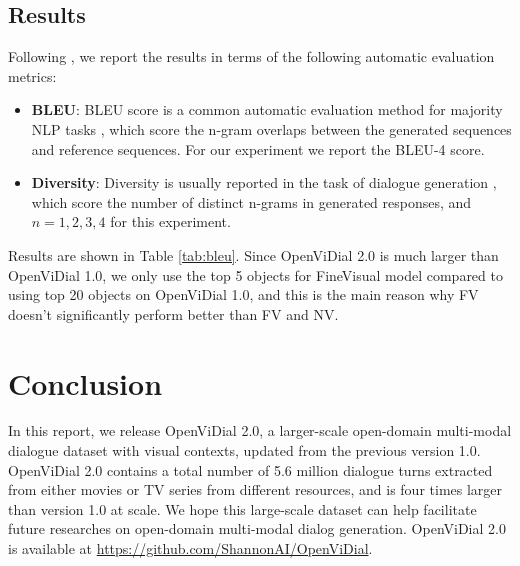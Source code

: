 \documentclass[11pt,a4paper]{article}
\begin{document}
\subsection{Results}
Following \citet{wang2021modeling}, we report the results in terms of the following automatic evaluation metrics: 
\begin{itemize}
    \item {\bf BLEU}: BLEU score is a common automatic evaluation method for majority NLP tasks \citep{papineni2002bleu, sordoni2015neural}, which score the n-gram overlaps between the generated sequences and reference sequences. For our experiment we report the BLEU-4 score.
    \item {\bf Diversity}: Diversity is usually reported in the task of dialogue generation \cite{li2015diversity}, which score the number of distinct n-grams in generated responses, and $n=1,2,3,4$ for this experiment. 
\end{itemize}
Results are shown in Table \ref{tab:bleu}. Since OpenViDial 2.0 is much larger than OpenViDial 1.0, we only use the top 5 objects for FineVisual model compared to using top 20 objects on OpenViDial 1.0, and this is the main reason why FV doesn't significantly perform better than FV and NV. 

\section{Conclusion}
In this report, we release OpenViDial 2.0, a larger-scale open-domain multi-modal dialogue dataset with visual contexts, updated from the previous version 1.0. 
OpenViDial 2.0 contains a total number of 5.6 million dialogue turns extracted from either movies or TV series from different resources,
and is four times larger than version 1.0 at scale. 
We hope this large-scale dataset can help facilitate future researches on open-domain multi-modal dialog generation.
OpenViDial 2.0 is available at \url{https://github.com/ShannonAI/OpenViDial}.



\end{document}
